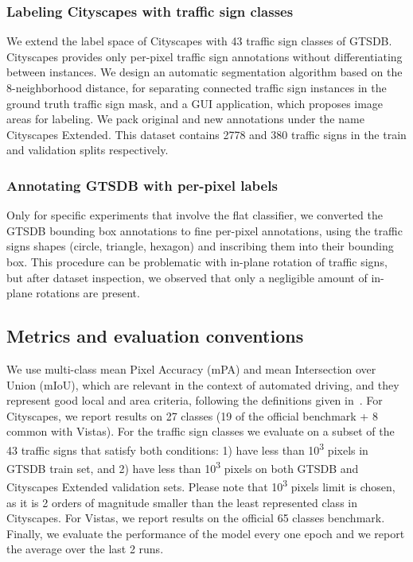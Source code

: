 \documentclass[letterpaper, 10 pt, conference]{ieeeconf}
\begin{document}
\subsubsection{Labeling Cityscapes with traffic sign classes}
We extend the label space of Cityscapes with 43 traffic sign classes of GTSDB. Cityscapes provides only per-pixel traffic sign annotations without differentiating between instances. We design an automatic segmentation algorithm based on the 8-neighborhood distance, for separating connected traffic sign instances in the ground truth traffic sign mask, and a GUI application, which proposes image areas for labeling. We pack original and new annotations under the name Cityscapes Extended. This dataset contains 2778 and 380 traffic signs in the train and validation splits respectively.

\subsubsection{Annotating GTSDB with per-pixel labels}
\label{subsec:gtsdb-bboxes-to-perpixel}
Only for specific experiments that involve the flat classifier, we converted the GTSDB bounding box annotations to fine per-pixel annotations, using the traffic signs shapes (circle, triangle, hexagon) and inscribing them into their bounding box. This procedure can be problematic with in-plane rotation of traffic signs, but after dataset inspection, we observed that only a negligible amount of in-plane rotations are present.

\subsection{Metrics and evaluation conventions}
\label{subsec:metrics}
We use multi-class mean Pixel Accuracy (mPA) and mean Intersection over Union (mIoU), which are relevant in the context of automated driving, and they represent good local and area criteria, following the definitions given in~\cite{garcia2017review}. For Cityscapes, we report results on 27 classes (19 of the official benchmark + 8 common with Vistas). For the traffic sign classes we evaluate on a subset of the 43 traffic signs that satisfy both conditions: 1) have less than 10\textsuperscript{3} pixels in GTSDB train set, and 2) have less than 10\textsuperscript{3} pixels on both GTSDB and Cityscapes Extended validation sets. Please note that 10\textsuperscript{3} pixels limit is chosen, as it is 2 orders of magnitude smaller than the least represented class in Cityscapes. For Vistas, we report results on the official 65 classes benchmark. Finally, we evaluate the performance of the model every one epoch and we report the average over the last 2 runs.
\end{document}
